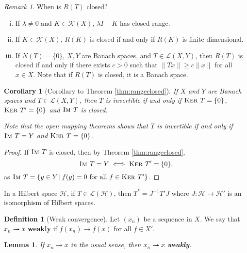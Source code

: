 \documentclass[10pt, oneside, reqno]{amsart}
\theoremstyle{plain}%
\newtheorem{lem}[thm]{Lemma}
\newtheorem*{cor}{Corollary}
\numberwithin{equation}{section}
\theoremstyle{definition}
\newtheorem{defn}[thm]{Definition}
\theoremstyle{remark}
\newtheorem*{rem}{Remark}
\newcommand{\given}{ \, | \,}
\newcommand{\im}{\textsc{Im\ }}
\renewcommand{\ker}{\textsc{Ker\ }}
\begin{document}
\begin{rem}When is $R(T)$ closed?
    
    \begin{enumerate}[(i)]
        \item If $\lambda \neq 0$ and $K \in \mathcal K(X)$, $\lambda I - K$ has closed range.
        \item If $K \in \mathcal K(X)$, $R(K)$ is closed if and only if $R(K)$ is finite dimensional.  
        \item If $N(T) = \{ 0 \}$, $X, Y$ are Banach spaces, and $T \in \mathcal L(X, Y)$, then $R(T)$ is closed if and only if there exists $c > 0$ such that $\| Tx \| \geq c \| x \|$ for all $x \in X$.  Note that if $R(T)$ is closed, it is a Banach space.  
    \end{enumerate}
    
\end{rem}



\begin{cor}[Corollary to Theorem \ref{thm:rangeclosed}]
    If $X$ and $Y$ are Banach spaces and $T \in \mathcal L(X, Y)$, then $T$ is invertible if and only if $\ker T = \{ 0 \}$, $\ker T' = \{ 0 \}$ and $\im T$ is closed. 
    
    Note that the open mapping theorems shows that $T$ is invertible if and only if $\im T = Y$ and $\ker T = \{ 0 \}$. 
\end{cor}

\begin{proof}
    If $\im T$ is closed, then by Theorem \ref{thm:rangeclosed}, \[
        \im T = Y \iff \ker T' = \{ 0 \},
    \] as $\im T = \{ y \in Y \given f(y) = 0 \text{ for all } f \in \ker T' \}$.  
\end{proof}  

In a Hilbert space $\mathcal H$, if $T \in \mathcal L(\mathcal H)$, then $T^* = J^{-1} T' J$ where $J: \mathcal H \rightarrow \mathcal H'$ is an isomorphism of Hilbert spaces.  

\begin{defn}[Weak convergence]
    Let $(x_n)$ be a sequence in $X$.  We say that $x_n \rightharpoonup x$ \textbf{weakly} if $f(x_n) \rightarrow f(x)$ for all $f \in X'$.
\end{defn}

\begin{lem}
    If $x_n \rightarrow x$ in the usual sense, then $x_n \rightharpoonup x$ \textbf{weakly}. 
\end{lem}
\end{document}
